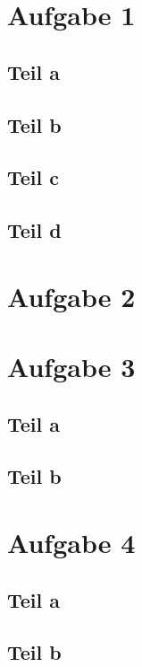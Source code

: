 \documentclass[10pt,a4paper]{article}
\begin{document}
\section{Aufgabe 1}

\subsection{Teil a}

\subsection{Teil b}

\subsection{Teil c}

\subsection{Teil d}

\section{Aufgabe 2}

\section{Aufgabe 3}

\subsection{Teil a}

\subsection{Teil b}

\section{Aufgabe 4}

\subsection{Teil a}

\subsection{Teil b}
\end{document}
